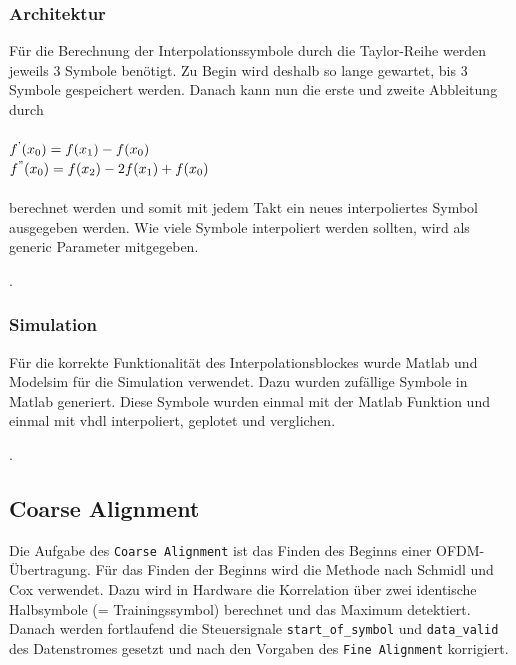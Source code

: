 \subsubsection{Architektur}
Für die Berechnung der Interpolationssymbole durch die Taylor-Reihe werden jeweils 3 Symbole benötigt. Zu Begin wird deshalb so lange gewartet, bis 3 Symbole gespeichert werden. Danach kann nun die erste und zweite Abbleitung durch
\\
\\
$f\textsuperscript{'}(x\textsubscript{0})=f(x\textsubscript{1})-f(x\textsubscript{0}) $\\
\noindent $f\textsuperscript{''}(x\textsubscript{0})=f(x\textsubscript{2})-2f(x\textsubscript{1})+f(x\textsubscript{0}) $
\\
\\
\noindent berechnet werden und somit mit jedem Takt ein neues interpoliertes Symbol ausgegeben werden. Wie viele Symbole interpoliert werden sollten, wird als generic Parameter mitgegeben.

.



\subsubsection{Simulation}

Für die korrekte Funktionalität des Interpolationsblockes wurde Matlab und Modelsim für die Simulation verwendet. Dazu wurden zufällige Symbole in Matlab generiert. Diese Symbole wurden einmal mit der Matlab Funktion und einmal mit vhdl interpoliert, geplotet und verglichen.


.

\subsection{Coarse Alignment}
Die Aufgabe des \texttt{Coarse Alignment} ist das Finden des Beginns einer OFDM-Übertragung. Für das Finden der Beginns wird die Methode nach Schmidl und Cox verwendet. Dazu wird in Hardware die Korrelation über zwei identische Halbsymbole (= Trainingssymbol) berechnet und das Maximum detektiert. Danach werden fortlaufend die Steuersignale \texttt{start\_of\_symbol} und \texttt{data\_valid} des Datenstromes gesetzt und nach den Vorgaben des \texttt{Fine Alignment} korrigiert.

